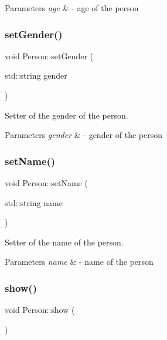 \begin{DoxyParams}{Parameters}
{\em age} & -\/ age of the person \\
\hline
\end{DoxyParams}
\mbox{\label{class_person_a7625b600d2c9c0b9c9fc060a6906dac6}} 
\subsubsection{\texorpdfstring{set\+Gender()}{setGender()}}
{\footnotesize\ttfamily void Person\+::set\+Gender (\begin{DoxyParamCaption}\item[{std\+::string}]{gender }\end{DoxyParamCaption})}



Setter of the gender of the person. 


\begin{DoxyParams}{Parameters}
{\em gender} & -\/ gender of the person \\
\hline
\end{DoxyParams}
\mbox{\label{class_person_ad6e438f456d3ae6f5b477931c0a6aeba}} 
\subsubsection{\texorpdfstring{set\+Name()}{setName()}}
{\footnotesize\ttfamily void Person\+::set\+Name (\begin{DoxyParamCaption}\item[{std\+::string}]{name }\end{DoxyParamCaption})}



Setter of the name of the person. 


\begin{DoxyParams}{Parameters}
{\em name} & -\/ name of the person \\
\hline
\end{DoxyParams}
\mbox{\label{class_person_a2f1231629a6e7e8c83ada57628e80a89}} 
\subsubsection{\texorpdfstring{show()}{show()}}
{\footnotesize\ttfamily void Person\+::show (\begin{DoxyParamCaption}{ }\end{DoxyParamCaption})\hspace{0.3cm}{\ttfamily [virtual]}}



